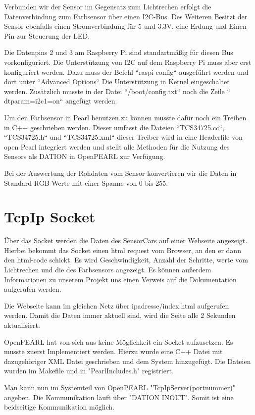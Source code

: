 Verbunden wir der Sensor im Gegensatz zum Lichtrechen erfolgt die Datenverbindung zum Farbsensor über einen I2C-Bus. Des Weiteren Besitzt der Sensor ebenfalls einen Stromverbindung für 5 und 3.3V, eine Erdung und Einen Pin zur Steuerung der LED.

Die Datenpins 2 und 3 am Raspberry Pi sind standartmäßig für diesen Bus vorkonfiguriert. Die Unterstützung von I2C auf dem Raspberry Pi muss aber erst konfiguriert werden. Dazu muss der Befehl “raspi-config“ ausgeführt werden und dort unter “Advanced Options“ Die Unterstützung in Kernel eingeschaltet werden. Zusätzlich musste in der Datei “/boot/config.txt“ noch die Zeile “ dtparam=i2c1=on“ angefügt werden.

Um den Farbsensor in Pearl benutzen zu können musste dafür noch ein Treiben in C++ geschrieben werden. Dieser umfasst die Dateien “TCS34725.cc“, “TCS34725.h“ und “TCS34725.xml“ dieser Treiber wird in eine Headerfile von open Pearl integriert werden und stellt alle Methoden für die Nutzung des Sensors als DATION in OpenPEARL zur Verfügung.

Bei der Auswertung der Rohdaten vom Sensor konvertieren wir die Daten in Standard RGB Werte mit einer Spanne von 0 bis 255.

\section{TcpIp Socket}
Über das Socket werden die Daten des SensorCars auf einer Webseite angezeigt. Hierbei bekommt das Socket einen html request vom Browser, an den er dann den html-code schickt. Es wird Geschwindigkeit, Anzahl der Schritte, werte vom Lichtrechen und die des Farbsensors angezeigt. Es können außerdem Informationen zu unserem Projekt uns einen Verweis auf die Dokumentation aufgerufen werden. 

Die Webseite kann im gleichen Netz über ipadresse/index.html aufgerufen werden. Damit die Daten immer aktuell sind, wird die Seite alle 2 Sekunden aktualisiert.

OpenPEARL hat von sich aus keine Möglichkeit ein Socket aufzusetzen. Es musste zuerst Implementiert werden. Hierzu wurde eine C++ Datei mit dazugehöriger XML Datei geschrieben und dem System hinzugefügt. Die Dateien wurden im Makefile und in "PearlIncludes.h" registriert. 

Man kann nun im Systemteil von OpenPEARL "TcpIpServer(portnummer)" angeben. Die Kommunikation läuft über "DATION INOUT". Somit ist eine beidseitige Kommunikation möglich. 
